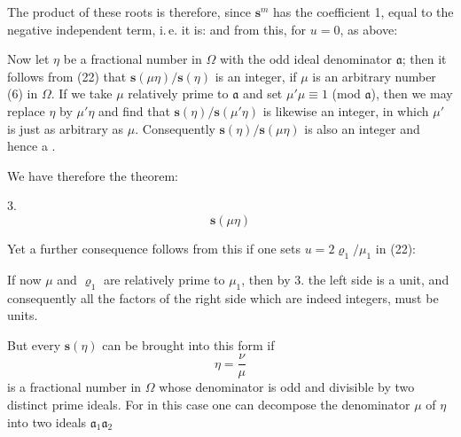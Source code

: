
The product of these roots is therefore, since $\boldsymbol{s}^m$ has the coefficient 1,
equal to the negative independent term, i.\,e. it is:
and from this, for $u = 0$, as above:

Now let $\eta$ be a fractional number in $\Omega$ with the odd
ideal denominator $\mathfrak{a}$; then it follows from (22) that $\boldsymbol{s}(\mu\eta)/\boldsymbol{s}(\eta)$ is an
integer, if $\mu$ is an arbitrary number (6) in $\Omega$. If we take
$\mu$ relatively prime to $\mathfrak{a}$ and set $\mu'\mu \equiv 1$ (mod $\mathfrak{a}$), then we may
replace $\eta$ by $\mu'\eta$ and find that $\boldsymbol{s}(\eta)/\boldsymbol{s}(\mu'\eta)$
is likewise an integer, in which $\mu'$ is just as arbitrary as $\mu$. Consequently
$\boldsymbol{s}(\eta)/\boldsymbol{s}(\mu\eta)$ is also an integer and hence a .

We have therefore the theorem:

3. 
\[
\boldsymbol{s}(\mu\eta)
\]

Yet a further consequence follows from this if one sets
$u = 2\varrho_1/\mu_1$ in (22):

If now $\mu$ and $\varrho_1$ are relatively prime to $\mu_1$, then by 3. the left side
is a unit, and consequently all the factors of the
right side
which are indeed integers, must be units.

But every $\boldsymbol{s}(\eta)$ can be brought into this form if
\[
\eta = \frac{\nu}{\mu}
\]
is a fractional number in $\Omega$ whose denominator is odd and divisible by
two distinct prime ideals. For in this case one
can decompose the denominator $\mu$ of $\eta$ into two ideals $\mathfrak{a}_1\mathfrak{a}_2$
